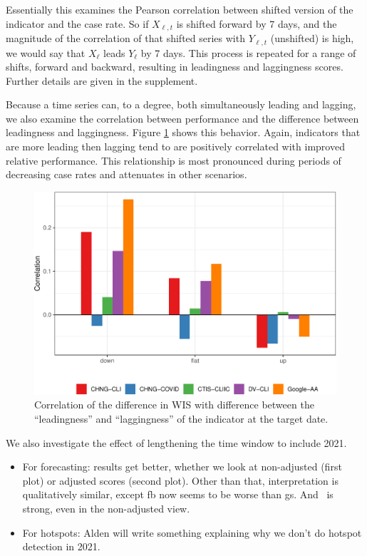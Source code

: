 
Essentially this examines the Pearson correlation between 
shifted version of the indicator and the case rate. So if $X_{\ell,t}$ is
shifted forward by 7 days, and the magnitude of the correlation of that shifted series with
$Y_{\ell,t}$ (unshifted) is high, we would say that $X_{\ell}$ leads $Y_{\ell}$
by 7 days. This process is repeated for a range of shifts, forward and backward,
resulting in leadingness and laggingness scores. Further details are given in
the supplement.


Because a time series can, to a degree, both simultaneously leading and lagging,
we also examine the correlation between performance and the difference between
leadingness and laggingness. Figure \ref{fig:diff-btw-leading-lagging} shows
this behavior. Again, indicators that are more leading then lagging tend to
are positively correlated with improved relative performance. This relationship
is most pronounced during periods of decreasing case rates and attenuates in
other scenarios.


\begin{figure}[t]
  \includegraphics[width=\columnwidth]{fig/diff-in-lead-lag-1.pdf}
  \caption{Correlation of the difference in WIS with difference between the
    ``leadingness'' and ``laggingness'' of the indicator at the target date.}
  \label{fig:diff-btw-leading-lagging}
\end{figure}




We also investigate the effect of lengthening the time window to include 2021. 
\begin{itemize}
\item For forecasting: results get better, whether we look at
  non-adjusted (first plot) or adjusted scores (second plot).  Other
  than that, interpretation is qualitatively similar, except fb now
  seems to be worse than gs.  And \chngcli~is strong, even in the
  non-adjusted view.
  \item For hotspots: Alden will write something explaining why we
    don't do hotspot detection in 2021.
\end{itemize}

